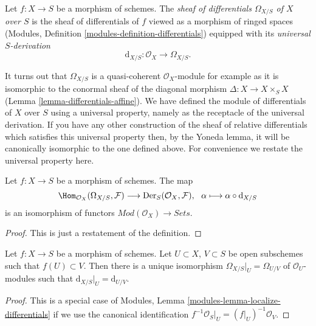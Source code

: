 \begin{definition}
\label{definition-sheaf-differentials}
Let $f : X \to S$ be a morphism of schemes.
The {\it sheaf of differentials $\Omega_{X/S}$ of $X$ over $S$} is
the sheaf of differentials of $f$ viewed as a morphism of ringed spaces
(Modules, Definition \ref{modules-definition-differentials})
equipped with its {\it universal $S$-derivation}
$$
\text{d}_{X/S} : \mathcal{O}_X \longrightarrow \Omega_{X/S}.
$$
\end{definition}

\noindent
It turns out that $\Omega_{X/S}$ is a quasi-coherent $\mathcal{O}_X$-module
for example as it is isomorphic to the conormal sheaf
of the diagonal morphism $\Delta : X \to X \times_S X$
(Lemma \ref{lemma-differentials-affine}).
We have defined the module of differentials of $X$ over $S$ using a
universal property, namely as the receptacle of the universal derivation.
If you have any other construction of the sheaf of relative differentials
which satisfies this universal property then, by the Yoneda lemma,
it will be canonically isomorphic to the one defined above. For convenience
we restate the universal property here.

\begin{lemma}
\label{lemma-universal-derivation-universal}
Let $f : X \to S$ be a morphism of schemes. The map
$$
\Hom_{\mathcal{O}_X}(\Omega_{X/S}, \mathcal{F})
\longrightarrow
\text{Der}_S(\mathcal{O}_X, \mathcal{F}), \ \
\alpha
\longmapsto
\alpha \circ \text{d}_{X/S}
$$
is an isomorphism of functors $\textit{Mod}(\mathcal{O}_X) \to \textit{Sets}$.
\end{lemma}

\begin{proof}
This is just a restatement of the definition.
\end{proof}

\begin{lemma}
\label{lemma-differentials-restrict-open}
Let $f : X \to S$ be a morphism of schemes.
Let $U \subset X$, $V \subset S$ be open subschemes such
that $f(U) \subset V$. Then there is a unique isomorphism
$\Omega_{X/S}|_U = \Omega_{U/V}$ of $\mathcal{O}_U$-modules such that
$\text{d}_{X/S}|_U = \text{d}_{U/V}$.
\end{lemma}

\begin{proof}
This is a special case of
Modules, Lemma \ref{modules-lemma-localize-differentials}
if we use the canonical identification
$f^{-1}\mathcal{O}_S|_U = (f|_U)^{-1}\mathcal{O}_V$.
\end{proof}

